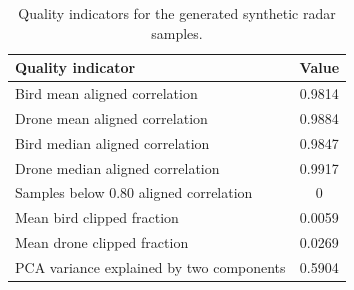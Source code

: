\begin{table}[htbp]
\centering
\small
\begin{tabular}{lc}
\toprule
Quality indicator & Value \\
\midrule
Bird mean aligned correlation & 0.9814 \\
Drone mean aligned correlation & 0.9884 \\
Bird median aligned correlation & 0.9847 \\
Drone median aligned correlation & 0.9917 \\
Samples below 0.80 aligned correlation & 0 \\
Mean bird clipped fraction & 0.0059 \\
Mean drone clipped fraction & 0.0269 \\
PCA variance explained by two components & 0.5904 \\
\bottomrule
\end{tabular}
\caption{Quality indicators for the generated synthetic radar samples.}
\label{tab:synthetic-quality}
\end{table}
